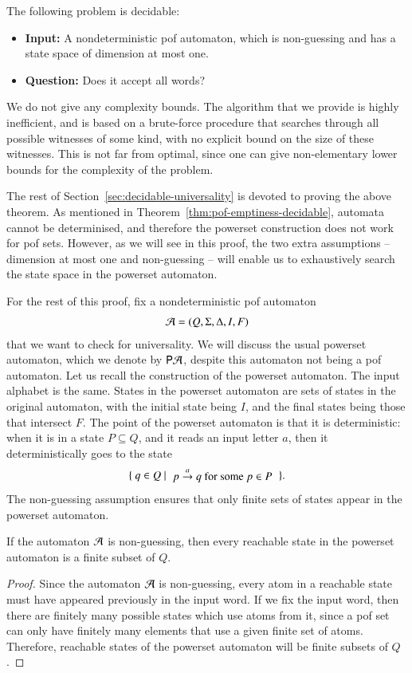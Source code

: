 \begin{theorem}\label{thm:universality-decidable-pof}
    The following problem is decidable: 
    \begin{itemize}
        \item \textbf{Input:} A nondeterministic pof automaton, which is non-guessing and has a state space of dimension at most one.
        \item \textbf{Question:} Does it  accept all  words?
    \end{itemize} 
\end{theorem}

We do not give any complexity bounds. The algorithm that we provide is highly inefficient, and is based on a brute-force procedure that searches through all possible witnesses of some kind, with no explicit bound on the size of these witnesses. This is not far from optimal, since one can give non-elementary lower bounds for the complexity of the problem.

The rest of Section~\ref{sec:decidable-universality} is devoted to proving the above theorem. 
As mentioned in Theorem~\ref{thm:pof-emptiness-decidable}, automata cannot be determinised, and therefore the powerset construction does not work for pof sets. However, as we will see in this proof,  the two extra assumptions -- dimension at most one and non-guessing -- will enable us to exhaustively search the state space in the powerset automaton.

For the rest of this proof, fix  a nondeterministic pof automaton 
\begin{align*}
{\mathcal A} = (Q, \Sigma, \Delta, I, F)
\end{align*}
that we want to check for universality. 
We will discuss the usual powerset automaton, which we denote by ${\mathsf P} {\mathcal A}$, despite this automaton not being a pof automaton. Let us recall the construction of the powerset automaton. The input alphabet is the same.  States in the powerset automaton are sets of states in the original automaton, with the  initial state being $I$, and  the final states being  those that intersect $F$. The point of the powerset automaton is that it is deterministic: when it is  in a  state $P \subseteq Q$,  and it reads an input letter $a$, then it deterministically goes to the state 
\begin{align*}
\setbuild{ q \in Q}{$ p \stackrel a \to q $ for some $p \in P$}.
\end{align*}
The non-guessing assumption  ensures that only finite sets of states appear in the powerset automaton. 
\begin{lemma}
    If the automaton ${\mathcal A}$ is non-guessing, then every reachable state in the powerset automaton is a finite subset of $Q$.
\end{lemma}
\begin{proof}
Since the automaton ${\mathcal A}$ is non-guessing, every atom in a reachable state must have appeared previously in the input word.  If we fix the input word, then there are finitely many  possible states which use atoms from it,   since a pof set can only have finitely many elements that use a given finite set of atoms. Therefore, reachable states of the powerset automaton will be finite subsets of $Q$. 
\end{proof}


